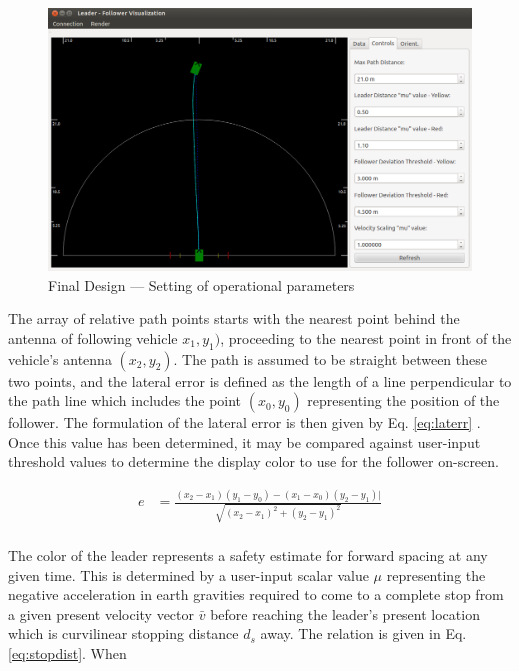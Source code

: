 \documentclass[12pt]{report}
\begin{document}
\begin{figure}[htbp]
    \centering
    \includegraphics[width=6.5in]{./figs/final_design_opts.png}
    \caption{Final Design --- Setting of operational parameters }
    \label{fig:finaldesopts}
\end{figure}

The array of relative path points starts with the nearest point behind the antenna of following vehicle $x_1,y_1)$, proceeding to the nearest point in front of the vehicle's antenna $(x_2,y_2)$. The path is assumed to be straight between these two points, and the lateral error is defined as the length of a line perpendicular to the path line which includes the point $(x_0,y_0)$ representing the position of the follower. The formulation of the lateral error is then given by Eq. \ref{eq:laterr} \cite{laterrformula}. Once this value has been determined, it may be compared against user-input threshold values to determine the display color to use for the follower on-screen.

\begin{align}
    \label{eq:laterr}
    e &= \frac{ (x_2 - x_1)(y_1 - y_0) - (x_1 - x_0)(y_2 - y_1) |}{ \sqrt{ (x_2 - x_1)^2 + (y_2 - y_1)^2 } }\\
\end{align}

The color of the leader represents a safety estimate for forward spacing at any given time. This is determined by a user-input scalar value $\mu$ representing the negative acceleration in earth gravities required to come to a complete stop from a given present velocity vector $\bar{v}$ before reaching the leader's present location which is curvilinear stopping distance $d_s$ away. The relation is given in Eq. \ref{eq:stopdist}. When 
\end{document}
